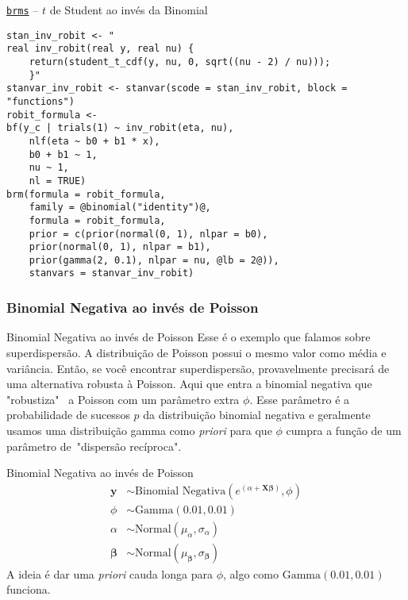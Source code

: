 \begin{frame}[fragile]{\href{https://paul-buerkner.github.io/brms/}{\texttt{brms}} -- $t$ de Student ao invés da Binomial}
    \begin{lstlisting}[basicstyle=\footnotesize]
stan_inv_robit <- "
real inv_robit(real y, real nu) {
    return(student_t_cdf(y, nu, 0, sqrt((nu - 2) / nu)));
    }"
stanvar_inv_robit <- stanvar(scode = stan_inv_robit, block = "functions")
robit_formula <-
bf(y_c | trials(1) ~ inv_robit(eta, nu),
    nlf(eta ~ b0 + b1 * x),
    b0 + b1 ~ 1,
    nu ~ 1,
    nl = TRUE)
brm(formula = robit_formula,
    family = @binomial("identity")@,
    formula = robit_formula,
    prior = c(prior(normal(0, 1), nlpar = b0),
    prior(normal(0, 1), nlpar = b1),
    prior(gamma(2, 0.1), nlpar = nu, @lb = 2@)),
    stanvars = stanvar_inv_robit)
    \end{lstlisting}
\end{frame}

\subsubsection{Binomial Negativa ao invés de Poisson}
\begin{frame}{Binomial Negativa ao invés de Poisson}
    Esse é o exemplo que falamos sobre superdispersão.
    A distribuição de Poisson possui o mesmo valor como média e variância.
    \vfill
    Então, se você encontrar superdispersão, provavelmente precisará de uma alternativa
    robusta à Poisson. Aqui que entra a binomial negativa que "robustiza"~
    a Poisson com um parâmetro extra $\phi$.
    \vfill
    Esse parâmetro é a probabilidade de sucessos $p$ da distribuição binomial negativa
    e geralmente usamos uma distribuição gamma como \textit{priori} para que $\phi$
    cumpra a função de um parâmetro de~"dispersão recíproca".
\end{frame}

\begin{frame}{Binomial Negativa ao invés de Poisson}
    $$
    \begin{aligned}
    \boldsymbol{y} &\sim \text{Binomial Negativa} \left( e^{(\alpha + \mathbf{X} \boldsymbol{\beta})}, \phi \right) \\
    \phi &\sim \text{Gamma}(0.01, 0.01) \\
    \alpha &\sim \text{Normal}(\mu_\alpha, \sigma_\alpha) \\
    \boldsymbol{\beta} &\sim \text{Normal}(\mu_{\boldsymbol{\beta}}, \sigma_{\boldsymbol{\beta}})
    \end{aligned}
    $$
    A ideia é dar uma \textit{priori} cauda longa para $\phi$, algo como
    $\text{Gamma}(0.01, 0.01)$ funciona.
\end{frame}

